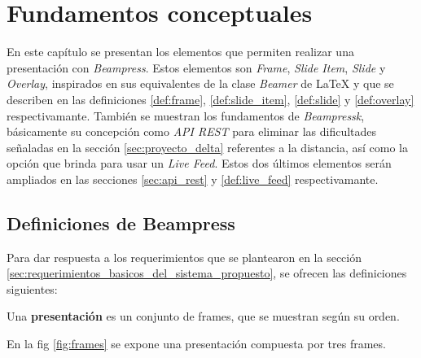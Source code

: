 
\chapter{Fundamentos conceptuales} %
\label{cha:fundamentos_conceptuales}
	En este capítulo se presentan los elementos que permiten realizar una presentación con \textit{Beampress}. Estos elementos son \textit{Frame}, \textit{Slide Item}, \textit{Slide} y \textit{Overlay}, inspirados en sus equivalentes de la clase \textit{Beamer} de \LaTeX{} y que se describen en las definiciones \ref{def:frame}, \ref{def:slide_item}, \ref{def:slide} y \ref{def:overlay} respectivamante. También se muestran los fundamentos de \textit{Beampressk}, básicamente su concepción como \textit{API REST} para eliminar las dificultades señaladas en la sección \ref{sec:proyecto_delta} referentes a la distancia, así como la opción que brinda para usar un \textit{Live Feed}. Estos dos últimos elementos serán ampliados en las secciones \ref{sec:api_rest} y \ref{def:live_feed} respectivamante. 

	\section{Definiciones de Beampress} %
	\label{sec:definiciones_de_beampress}
		Para dar respuesta a los requerimientos que se plantearon en la sección \ref{sec:requerimientos_basicos_del_sistema_propuesto}, se ofrecen las definiciones siguientes:

		
 		\begin{definition}
 		\label{def:presentation}
			Una \textbf{presentación} es un conjunto de frames, que se muestran según su orden.
 		\end{definition}

 		En la fig \ref{fig:frames} se expone una presentación compuesta por tres frames.

